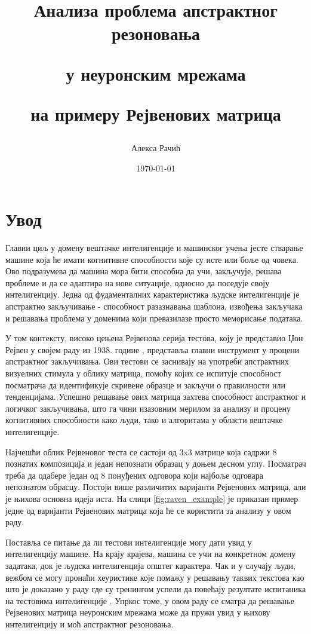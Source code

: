 \documentclass[a4paper, 12pt, master, utf8]{etf}
\author{Алекса Рачић}
\date{\today}
\title{Анализа проблема апстрактног резоновања

у неуронским мрежама

на примеру Рејвенових матрица}
\begin{document}
\maketitle

\tableofcontents

\onehalfspacing
\newpage

\chapter{Увод}
\label{sec:1}

Главни циљ у домену вештачке интелигенције и машинског учења јесте стварање машине која ће имати когнитивне способности које су исте или боље од човека. Ово подразумева да машина мора бити способна да учи, закључује, решава проблеме и да се адаптира на нове ситуације, односно да поседује своју интелигенцију.
Једна од фудаменталних карактеристика људске интелигенције је апстрактно закључивање - способност разазнавања шаблона, извођења закључака и решавања проблема у доменима који превазилазе просто меморисање података.
\newline

У том контексту, високо цењена Рејвенова серија тестова, коју је представио Џон Рејвен у својем раду из 1938. године \cite{raven1938raven}, представља главни инструмент у процени апстрактног закључивања. Ови тестови се заснивају на употреби апстрактних визуелних стимула у облику матрица, 
помоћу којих се испитује способност посматрача да идентификује скривене образце и закључи о правилности или тенденцијама. Успешно решавање ових матрица захтева способност апстрактног и логичког закључивања, што га чини изазовним мерилом за анализу и процену когнитивних способности како људи, тако и алгоритама у области вештачке интелигенције.
\newline 

Најчешћи облик Рејвеновог теста се састоји од 3x3 матрице која садржи 8 познатих композиција и један непознати образац у доњем десном углу. Посматрач треба да одабере један од 8 понуђених одговора који најбоље одговара непознатом обрасцу. Постоји више различитих варијанти Рејвенових матрица, али је њихова основна идеја иста. На слици \ref{fig:raven_example} 
је приказан пример једне од варијанти Рејвенових матрица која ће се користити за анализу у овом раду.
\newline


Поставља се питање да ли тестови интелигенције могу дати увид у интелигенцију машине. На крају 
крајева, машина се учи на конкретном домену задатака, док је људска интелигенција општег карактера. 
Чак и у случају људи, вежбом се могу пронаћи хеуристике које помажу у решавању таквих текстова као 
што је доказано у раду где су тренингом успели да повећају резултате испитаника на тестовима интелигенције \cite{te2001practice}.
Упркос томе, у овом раду се сматра да решавање Рејвенових матрица неуронским мрежама може да пружи увид у њихову интелигенцију и моћ апстрактног резоновања. 
\newline
\end{document}
